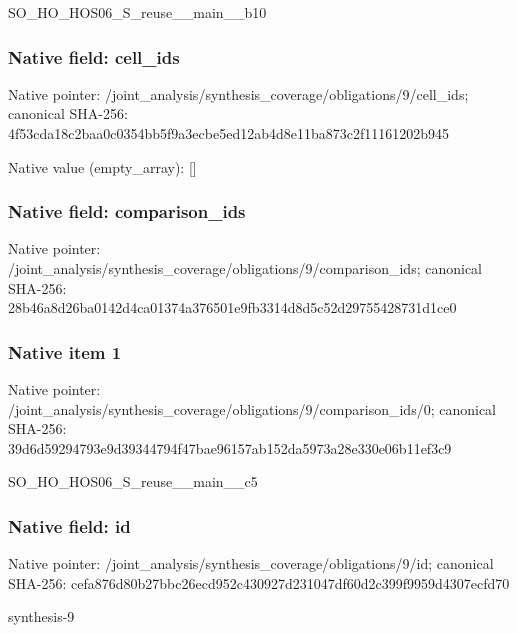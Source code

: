 \documentclass[10pt,a4paper]{article}
\begin{document}
\begingroup\raggedright\sloppy SO\_\allowbreak{}HO\_\allowbreak{}HOS06\_\allowbreak{}S\_\allowbreak{}reuse\_\allowbreak{}\_\allowbreak{}main\_\allowbreak{}\_\allowbreak{}b10\par\endgroup

\subsubsection{Native field: cell\_\allowbreak{}ids}
Native pointer: /joint\_\allowbreak{}analysis/synthesis\_\allowbreak{}coverage/obligations/9/cell\_\allowbreak{}ids; canonical SHA-256: 4f53cda18c2baa0c0354bb5f9a3ecbe5ed12ab4d8e11ba873c2f11161202b945

Native value (empty\_\allowbreak{}array): []

\subsubsection{Native field: comparison\_\allowbreak{}ids}
Native pointer: /joint\_\allowbreak{}analysis/synthesis\_\allowbreak{}coverage/obligations/9/comparison\_\allowbreak{}ids; canonical SHA-256: 28b46a8d26ba0142d4ca01374a376501e9fb3314d8d5c52d29755428731d1ce0

\subsubsection{Native item 1}
Native pointer: /joint\_\allowbreak{}analysis/synthesis\_\allowbreak{}coverage/obligations/9/comparison\_\allowbreak{}ids/0; canonical SHA-256: 39d6d59294793e9d39344794f47bae96157ab152da5973a28e330e06b11ef3c9

\begingroup\raggedright\sloppy SO\_\allowbreak{}HO\_\allowbreak{}HOS06\_\allowbreak{}S\_\allowbreak{}reuse\_\allowbreak{}\_\allowbreak{}main\_\allowbreak{}\_\allowbreak{}c5\par\endgroup

\subsubsection{Native field: id}
Native pointer: /joint\_\allowbreak{}analysis/synthesis\_\allowbreak{}coverage/obligations/9/id; canonical SHA-256: cefa876d80b27bbc26ecd952c430927d231047df60d2c399f9959d4307ecfd70

\begingroup\raggedright\sloppy synthesis-9\par\endgroup
\end{document}
